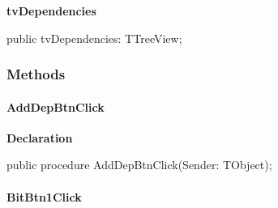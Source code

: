 \documentclass{report}
\newif\ifpdf
\begin{document}
\begin{list}{}
\begin{flushleft}
\ifpdf
\end{flushleft}
\fi


\par  \label{prjwizard.TfrmProjectWizard-tvDependencies}
\item[\textbf{tvDependencies}\hfill]
\ifpdf
\begin{flushleft}
\fi
\begin{ttfamily}
public tvDependencies: TTreeView;\end{ttfamily}

\ifpdf
\end{flushleft}
\fi


\par  \end{list}
\subsubsection*{\large{\textbf{Methods}}\normalsize\hspace{1ex}\hfill}
\paragraph*{AddDepBtnClick}\hspace*{\fill}

\label{prjwizard.TfrmProjectWizard-AddDepBtnClick}
\begin{list}{}{
\setlength{\itemindent}{0cm}
\setlength{\listparindent}{0cm}
\setlength{\leftmargin}{\evensidemargin}
\addtolength{\leftmargin}{\tmplength}
\settowidth{\labelsep}{X}
\addtolength{\leftmargin}{\labelsep}
\setlength{\labelwidth}{\tmplength}
}
\item[\textbf{Declaration}\hfill]
\ifpdf
\begin{flushleft}
\fi
\begin{ttfamily}
public procedure AddDepBtnClick(Sender: TObject);\end{ttfamily}

\ifpdf
\end{flushleft}
\fi

\end{list}
\paragraph*{BitBtn1Click}\hspace*{\fill}
\end{document}
